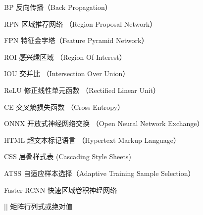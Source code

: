 
\begin{denotation}[3cm]
  \item[BP] 反向传播（Back Propagation）
  \item[RPN] 区域推荐网络 （Region Proposal Network）
  \item[FPN] 特征金字塔（Feature Pyramid Network）
  \item[ROI] 感兴趣区域 （Region Of Interest）
  \item[IOU] 交并比 （Intersection Over Union）
  \item[ReLU] 修正线性单元函数 （Rectified Linear Unit）
  \item[CE] 交叉熵损失函数 （Cross Entropy）
  \item[ONNX] 开放式神经网络交换 （Open Neural Network Exchange）
  \item[HTML] 超文本标记语言 （Hypertext Markup Language）
  \item[CSS] 层叠样式表 (Cascading Style Sheets)
  \item[ATSS] 自适应样本选择（Adaptive Training Sample Selection）
  \item[Faster-RCNN] 快速区域卷积神经网络
  \item[$\left| {} \right|$] 矩阵行列式或绝对值
\end{denotation}



